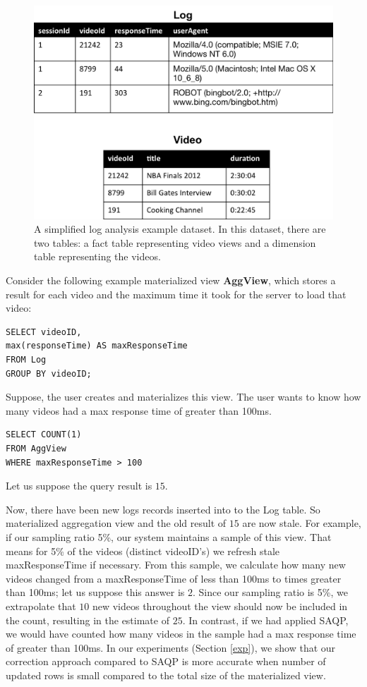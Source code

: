 \begin{figure}[h]
\label{example}
\centering
 \includegraphics[width=\columnwidth]{figs/sample-clean-example.png}
 \caption{A simplified log analysis example dataset. In this dataset, there are two tables: a fact table representing video views and a dimension table representing the videos.}
\end{figure}

Consider the following example materialized view \textbf{AggView}, which stores a result for each video and the maximum time it took for the server to load that video:
\begin{lstlisting} 
SELECT videoID, 
max(responseTime) AS maxResponseTime 
FROM Log 
GROUP BY videoID;
\end{lstlisting}

Suppose, the user creates and materializes this view.
The user wants to know how many videos had a max response time of greater than 100ms.
\begin{lstlisting} 
SELECT COUNT(1)
FROM AggView
WHERE maxResponseTime > 100
\end{lstlisting}
Let us suppose the query result is $15$.

Now, there have been new logs records inserted into to the Log table. 
So materialized aggregation view and the old result of $15$ are now stale.
For example, if our sampling ratio 5\%, our system maintains a sample of this view.
That means for 5\% of the videos (distinct videoID's) we refresh stale maxResponseTime if necessary.
From this sample, we calculate how many new videos changed from a maxResponseTime of less than 100ms to times greater than 100ms; let us suppose this answer is $2$.
Since our sampling ratio is 5\%, we extrapolate that $10$ new videos throughout the view should now be included in the count, resulting in the estimate of $25$.
In contrast, if we had applied SAQP, we would have counted how many videos in the sample had a max response time of greater than 100ms.
In our experiments (Section \ref{exp}), we show that our correction approach compared to SAQP is more accurate when number of updated rows is small compared to the total size of the materialized view.